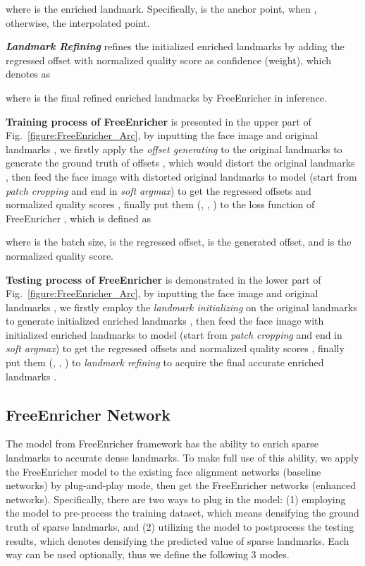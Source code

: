 \documentclass[letterpaper]{article} \usepackage{aaai23}  \usepackage{times}  \usepackage{helvet}  \usepackage{courier}  \usepackage[hyphens]{url}  \usepackage{graphicx} \urlstyle{rm} \def\UrlFont{\rm}  \usepackage{natbib}  \usepackage{caption} \frenchspacing  \setlength{\pdfpagewidth}{8.5in}  \setlength{\pdfpageheight}{11in}  \usepackage{algorithm}
\begin{document}
where  is the enriched landmark. 
Specifically,  is the anchor point, when , otherwise, the interpolated point.

\vspace{5pt}
\noindent\textbf{\emph{Landmark Refining}}
refines the initialized enriched landmarks  by adding the regressed offset  with normalized quality score  as confidence (weight), which denotes as

where  is the final refined enriched landmarks by FreeEnricher in inference.

\vspace{5pt}
\noindent\textbf{Training process of FreeEnricher}
is presented in the upper part of Fig.~\ref{figure:FreeEnricher_Arc}, by inputting the face image  and original landmarks , we firstly apply the \emph{offset generating} to the original landmarks  to generate the ground truth of offsets ,
which would distort the original landmarks ,
then feed the face image  with distorted original landmarks  to model (start from \emph{patch cropping} and end in \emph{soft argmax}) to get the regressed offsets  and normalized quality scores , finally put them (, , ) to the loss function of FreeEnricher , which is defined as



where  is the batch size,  is the regressed offset,  is the generated offset, and  is the normalized quality score.



\vspace{5pt}
\noindent\textbf{Testing process of FreeEnricher}
is demonstrated in the lower part of Fig.~\ref{figure:FreeEnricher_Arc}, by inputting the face image  and original landmarks , we firstly employ the \emph{landmark initializing} on the original landmarks  to generate initialized enriched landmarks , then feed the face image  with initialized enriched landmarks  to model (start from \emph{patch cropping} and end in \emph{soft argmax}) to get the regressed offsets  and normalized quality scores , finally put them (, , ) to \emph{landmark refining} to acquire the final accurate enriched landmarks .



\subsection{FreeEnricher Network}

The model from FreeEnricher framework has the ability to enrich sparse landmarks to accurate dense landmarks.
To make full use of this ability, we apply the FreeEnricher model to the
existing face alignment networks (baseline networks) by plug-and-play mode,
then get the FreeEnricher networks (enhanced networks).
Specifically, there are two ways to plug in the model: (1) employing the model to pre-process the training dataset, which means densifying the ground truth of sparse landmarks, and (2) utilizing the model to postprocess the testing results, which denotes densifying the predicted value of sparse landmarks.
Each way can be used optionally, thus we define the following 3 modes.
\end{document}
